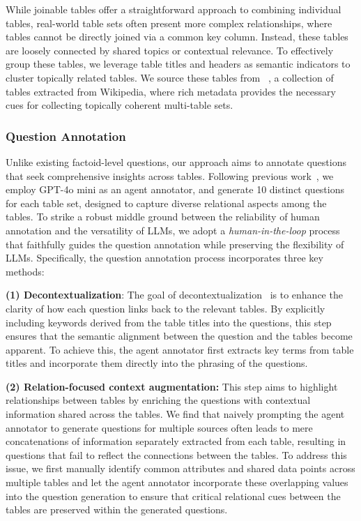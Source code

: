 While joinable tables offer a straightforward approach to combining individual tables, real-world table sets often present more complex relationships, where tables cannot be directly joined via a common key column. Instead, these tables are loosely connected by shared topics or contextual relevance.
To effectively group these tables, we leverage table titles and headers as semantic indicators to cluster topically related tables.  
We source these tables from \wikidataset~\cite{Kweon2023OpenWikiTableDF}, a collection of tables extracted from Wikipedia, where rich metadata provides the necessary cues for collecting topically coherent multi-table sets.

\subsubsection{Question Annotation} 
Unlike existing factoid-level questions, our approach aims to annotate  questions that seek comprehensive insights across tables. 
Following previous work~\citep{kim2024evaluatinglanguagemodelssynthetic}, we employ GPT-4o mini as an agent annotator, and generate 10 distinct questions for each table set, designed to capture diverse relational aspects among the tables. 
To strike a robust middle ground between the reliability of human annotation and the versatility of LLMs, we adopt a \textit{human-in-the-loop} process that faithfully guides the question annotation while preserving the flexibility of LLMs. 
Specifically, the question annotation process incorporates three key methods:

\textbf{(1) Decontextualization}:
The goal of decontextualization~\citep{ Choi2021DecontextualizationMS,Kweon2023OpenWikiTableDF} is to enhance the clarity of how each question links back to the relevant tables. 
By explicitly including keywords derived from the table titles into the questions, this step ensures that the semantic alignment between the question and the tables become apparent. 
To achieve this, the agent annotator first extracts key terms from table titles and incorporate them directly into the phrasing of the questions. 

\textbf{(2) Relation-focused context augmentation:}
This step aims to highlight relationships between tables by enriching the questions with contextual information shared across the tables.
We find that naively prompting the agent annotator to generate questions for multiple sources often leads to mere concatenations of information separately extracted from each table, resulting in questions that fail to reflect the connections between the tables.
To address this issue, we first manually identify common attributes and shared data points across multiple tables and let the agent annotator incorporate these overlapping values into the question generation to ensure that critical relational cues between the tables are preserved within the generated questions.

